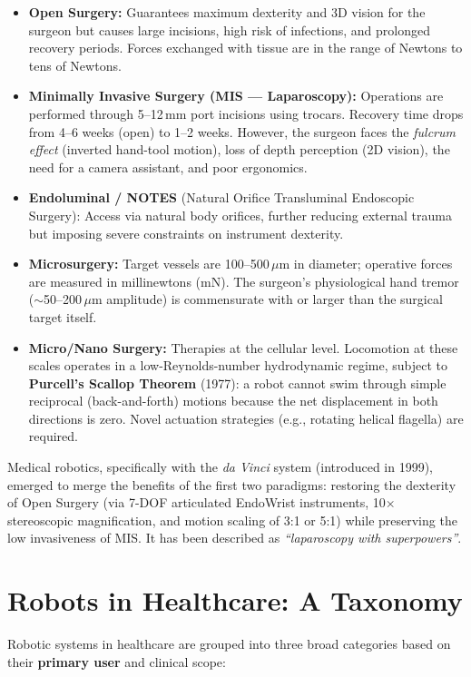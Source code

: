 \documentclass[11pt,a4paper,twoside]{report}
\begin{document}
\begin{itemize}
    \item \textbf{Open Surgery:} Guarantees maximum dexterity and 3D vision for the surgeon but causes large incisions, high risk of infections, and prolonged recovery periods. Forces exchanged with tissue are in the range of Newtons to tens of Newtons.
    \item \textbf{Minimally Invasive Surgery (MIS — Laparoscopy):} Operations are performed through 5--12\,mm port incisions using trocars. Recovery time drops from 4--6 weeks (open) to 1--2 weeks. However, the surgeon faces the \textit{fulcrum effect} (inverted hand-tool motion), loss of depth perception (2D vision), the need for a camera assistant, and poor ergonomics.
    \item \textbf{Endoluminal / NOTES} (Natural Orifice Transluminal Endoscopic Surgery): Access via natural body orifices, further reducing external trauma but imposing severe constraints on instrument dexterity.
    \item \textbf{Microsurgery:} Target vessels are 100--500\,$\mu$m in diameter; operative forces are measured in millinewtons (mN). The surgeon's physiological hand tremor ($\sim$50--200\,$\mu$m amplitude) is commensurate with or larger than the surgical target itself.
    \item \textbf{Micro/Nano Surgery:} Therapies at the cellular level. Locomotion at these scales operates in a low-Reynolds-number hydrodynamic regime, subject to \textbf{Purcell's Scallop Theorem} (1977): a robot cannot swim through simple reciprocal (back-and-forth) motions because the net displacement in both directions is zero. Novel actuation strategies (e.g., rotating helical flagella) are required.
\end{itemize}

Medical robotics, specifically with the \textit{da Vinci} system (introduced in 1999), emerged to merge the benefits of the first two paradigms: restoring the dexterity of Open Surgery (via 7-DOF articulated EndoWrist instruments, 10$\times$ stereoscopic magnification, and motion scaling of 3:1 or 5:1) while preserving the low invasiveness of MIS. It has been described as \textit{``laparoscopy with superpowers''}.

\section{Robots in Healthcare: A Taxonomy}
Robotic systems in healthcare are grouped into three broad categories based on their \textbf{primary user} and clinical scope:
\end{document}
